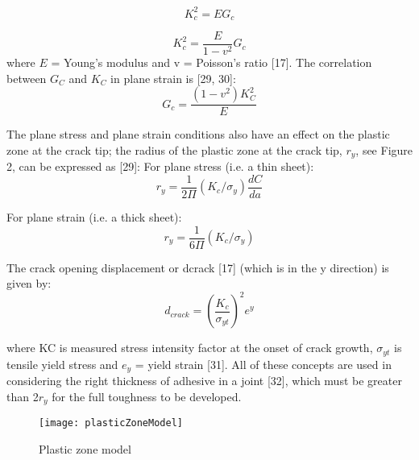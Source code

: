 \documentclass[numbers=noendperiod,chapterprefix=on]{icldt} %
\begin{document}
\begin{equation} \label{plane stress  [28]}
K_c^2=E G_c
\end{equation}

\begin{equation} \label{plane strain [28]}
K_c^2=\frac{E}{1-v^2} G_c
\end{equation}
where $E$ = Young’s modulus and v = Poisson’s ratio [17].
The correlation between $G_C$ and $K_C$ in plane strain is [29, 30]:
\begin{equation} \label{correlation [28]}
G_c = \frac{(1-v^2) K_C^2}{E} 
\end{equation}

The plane stress and plane strain conditions also have an effect on the plastic zone at the crack tip; the radius of the plastic zone at the crack tip, $r_y$, see Figure 2, can be expressed as [29]:
For plane stress (i.e. a thin sheet):
\begin{equation} \label{ry plane stress [28]}
r_y=\frac{1}{2\Pi}(K_c/\sigma_y) \frac{dC}{da}
\end{equation}

For plane strain (i.e. a thick sheet):
\begin{equation} \label{ry plane strain [28]}
r_y=\frac{1}{6\Pi}(K_c/\sigma_y)
\end{equation}

The crack opening displacement or dcrack [17] (which is in the y direction) is given by: 
\begin{equation} 
d_{crack}=\left( \frac{K_c}{\sigma _{yt}}\right) ^2 e^y
\end{equation}

where KC is measured stress intensity factor at the onset of crack growth,
$\sigma_{yt}$ is tensile yield stress and $e_y$ = yield strain [31].
All of these concepts are used in considering the right thickness of adhesive in a joint [32], which must be greater than 2$r_y$ for the full toughness to be developed. 

\begin{figure}[!htpb]
\centering
\texttt{[image: plasticZoneModel]}
\caption{Plastic zone model } 
\end{figure}
\end{document}
